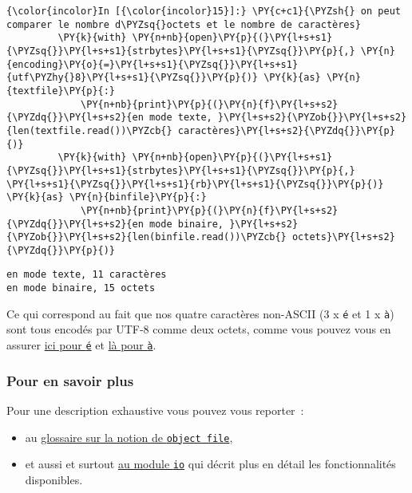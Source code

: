     \begin{Verbatim}[commandchars=\\\{\}]
{\color{incolor}In [{\color{incolor}15}]:} \PY{c+c1}{\PYZsh{} on peut comparer le nombre d\PYZsq{}octets et le nombre de caractères}
         \PY{k}{with} \PY{n+nb}{open}\PY{p}{(}\PY{l+s+s1}{\PYZsq{}}\PY{l+s+s1}{strbytes}\PY{l+s+s1}{\PYZsq{}}\PY{p}{,} \PY{n}{encoding}\PY{o}{=}\PY{l+s+s1}{\PYZsq{}}\PY{l+s+s1}{utf\PYZhy{}8}\PY{l+s+s1}{\PYZsq{}}\PY{p}{)} \PY{k}{as} \PY{n}{textfile}\PY{p}{:}
             \PY{n+nb}{print}\PY{p}{(}\PY{n}{f}\PY{l+s+s2}{\PYZdq{}}\PY{l+s+s2}{en mode texte, }\PY{l+s+s2}{\PYZob{}}\PY{l+s+s2}{len(textfile.read())\PYZcb{} caractères}\PY{l+s+s2}{\PYZdq{}}\PY{p}{)}
         \PY{k}{with} \PY{n+nb}{open}\PY{p}{(}\PY{l+s+s1}{\PYZsq{}}\PY{l+s+s1}{strbytes}\PY{l+s+s1}{\PYZsq{}}\PY{p}{,} \PY{l+s+s1}{\PYZsq{}}\PY{l+s+s1}{rb}\PY{l+s+s1}{\PYZsq{}}\PY{p}{)} \PY{k}{as} \PY{n}{binfile}\PY{p}{:}
             \PY{n+nb}{print}\PY{p}{(}\PY{n}{f}\PY{l+s+s2}{\PYZdq{}}\PY{l+s+s2}{en mode binaire, }\PY{l+s+s2}{\PYZob{}}\PY{l+s+s2}{len(binfile.read())\PYZcb{} octets}\PY{l+s+s2}{\PYZdq{}}\PY{p}{)}
\end{Verbatim}


    \begin{Verbatim}[commandchars=\\\{\}]
en mode texte, 11 caractères
en mode binaire, 15 octets

    \end{Verbatim}

    Ce qui correspond au fait que nos quatre caractères non-ASCII (3 x
\texttt{é} et 1 x \texttt{à}) sont tous encodés par UTF-8 comme deux
octets, comme vous pouvez vous en assurer
\href{https://mothereff.in/utf-8\#\%C3\%A9}{ici pour \texttt{é}} et
\href{https://mothereff.in/utf-8\#\%C3\%A0}{là pour \texttt{à}}.

    \hypertarget{pour-en-savoir-plus}{%
\subsubsection{Pour en savoir plus}\label{pour-en-savoir-plus}}

    Pour une description exhaustive vous pouvez vous reporter~:

\begin{itemize}
\tightlist
\item
  au
  \href{https://docs.python.org/3/glossary.html\#term-file-object}{glossaire
  sur la notion de \texttt{object\ file}},
\item
  et aussi et surtout
  \href{https://docs.python.org/3/library/io.html\#module-io}{au module
  \texttt{io}} qui décrit plus en détail les fonctionnalités
  disponibles.
\end{itemize}


    
    
    
